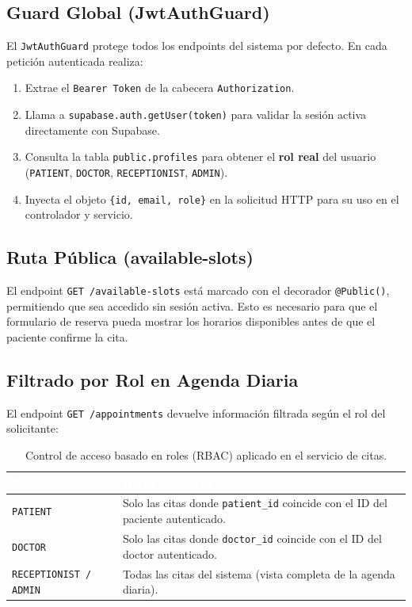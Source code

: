 \documentclass[a4paper,12pt]{article}
\renewcommand{\arraystretch}{1.1}
\begin{document}
    \subsection{Guard Global (JwtAuthGuard)}
    El \texttt{JwtAuthGuard} protege todos los endpoints del sistema por defecto. En cada petición autenticada realiza:
    \begin{enumerate}
        \item Extrae el \texttt{Bearer Token} de la cabecera \texttt{Authorization}.
        \item Llama a \texttt{supabase.auth.getUser(token)} para validar la sesión activa directamente con Supabase.
        \item Consulta la tabla \texttt{public.profiles} para obtener el \textbf{rol real} del usuario (\texttt{PATIENT}, \texttt{DOCTOR}, \texttt{RECEPTIONIST}, \texttt{ADMIN}).
        \item Inyecta el objeto \texttt{\{id, email, role\}} en la solicitud HTTP para su uso en el controlador y servicio.
    \end{enumerate}

    \subsection{Ruta Pública (available-slots)}
    El endpoint \texttt{GET /available-slots} está marcado con el decorador \texttt{@Public()}, permitiendo que sea accedido sin sesión activa. Esto es necesario para que el formulario de reserva pueda mostrar los horarios disponibles antes de que el paciente confirme la cita.

    \subsection{Filtrado por Rol en Agenda Diaria}
    El endpoint \texttt{GET /appointments} devuelve información filtrada según el rol del solicitante:

    \begin{table}[H]
    \centering\small\renewcommand{\arraystretch}{1.4}
    \begin{tabular}{|p{3.5cm}|p{10cm}|}
    \hline
    \rowcolor{SKTPrimary}
    \textcolor{white}{\textbf{Rol}} & \textcolor{white}{\textbf{Datos devueltos}} \\
    \hline
    \texttt{PATIENT} & Solo las citas donde \texttt{patient\_id} coincide con el ID del paciente autenticado. \\
    \hline
    \texttt{DOCTOR} & Solo las citas donde \texttt{doctor\_id} coincide con el ID del doctor autenticado. \\
    \hline
    \texttt{RECEPTIONIST / ADMIN} & Todas las citas del sistema (vista completa de la agenda diaria). \\
    \hline
    \end{tabular}
    \caption*{\footnotesize Control de acceso basado en roles (RBAC) aplicado en el servicio de citas.}
    \end{table}
\end{document}
